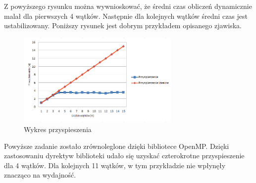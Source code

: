 \documentclass[a4paper,11pt]{article}
\begin{document}
Z powyższego rysunku można wywnioskować, że średni czas obliczeń dynamicznie malał dla pierwszych 4 wątków. Następnie dla kolejnych wątków średni czas jest ustabilizowany.
Poniższy rysunek jest dobrym przykładem opisanego zjawiska.


\begin{figure}[ht]
	\centering
  \includegraphics[width=0.7\textwidth]{2.png}
  \caption{Wykres przyspieszenia}
\end{figure}

Powyższe zadanie zostało zrównoleglone dzięki bibliotece OpenMP. Dzięki zastosowaniu dyrektyw biblioteki udało się uzyskać czterokrotne przyspieszenie dla 4 wątków. Dla kolejnych 11 wątków, w tym przykładzie nie wpłynęły znacząco na wydajność.
\end{document}
